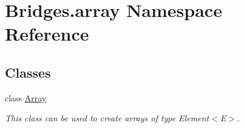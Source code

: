 \hypertarget{namespace_bridges_1_1array}{}\section{Bridges.\+array Namespace Reference}
\label{namespace_bridges_1_1array}
\subsection*{Classes}
\begin{DoxyCompactItemize}
\item 
class \hyperlink{class_bridges_1_1array_1_1_array}{Array}
\begin{DoxyCompactList}\small\item\em This class can be used to create arrays of type Element$<$\+E$>$. \end{DoxyCompactList}\end{DoxyCompactItemize}
